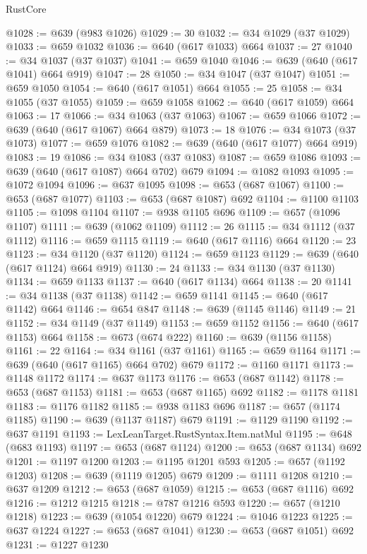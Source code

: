 \begin{lexlean}{RustCore}
\begin{coremodule}
@1028 := @639 (@983 @1026)
@1029 := 30
@1032 := @34 @1029 (@37 @1029)
@1033 := @659 @1032
@1036 := @640 (@617 @1033) @664
@1037 := 27
@1040 := @34 @1037 (@37 @1037)
@1041 := @659 @1040
@1046 := @639 (@640 (@617 @1041) @664 @919)
@1047 := 28
@1050 := @34 @1047 (@37 @1047)
@1051 := @659 @1050
@1054 := @640 (@617 @1051) @664
@1055 := 25
@1058 := @34 @1055 (@37 @1055)
@1059 := @659 @1058
@1062 := @640 (@617 @1059) @664
@1063 := 17
@1066 := @34 @1063 (@37 @1063)
@1067 := @659 @1066
@1072 := @639 (@640 (@617 @1067) @664 @879)
@1073 := 18
@1076 := @34 @1073 (@37 @1073)
@1077 := @659 @1076
@1082 := @639 (@640 (@617 @1077) @664 @919)
@1083 := 19
@1086 := @34 @1083 (@37 @1083)
@1087 := @659 @1086
@1093 := @639 (@640 (@617 @1087) @664 @702) @679
@1094 := @1082 @1093
@1095 := @1072 @1094
@1096 := @637 @1095
@1098 := @653 (@687 @1067)
@1100 := @653 (@687 @1077)
@1103 := @653 (@687 @1087) @692
@1104 := @1100 @1103
@1105 := @1098 @1104
@1107 := @938 @1105 @696
@1109 := @657 (@1096 @1107)
@1111 := @639 (@1062 @1109)
@1112 := 26
@1115 := @34 @1112 (@37 @1112)
@1116 := @659 @1115
@1119 := @640 (@617 @1116) @664
@1120 := 23
@1123 := @34 @1120 (@37 @1120)
@1124 := @659 @1123
@1129 := @639 (@640 (@617 @1124) @664 @919)
@1130 := 24
@1133 := @34 @1130 (@37 @1130)
@1134 := @659 @1133
@1137 := @640 (@617 @1134) @664
@1138 := 20
@1141 := @34 @1138 (@37 @1138)
@1142 := @659 @1141
@1145 := @640 (@617 @1142) @664
@1146 := @654 @847
@1148 := @639 (@1145 @1146)
@1149 := 21
@1152 := @34 @1149 (@37 @1149)
@1153 := @659 @1152
@1156 := @640 (@617 @1153) @664
@1158 := @673 (@674 @222)
@1160 := @639 (@1156 @1158)
@1161 := 22
@1164 := @34 @1161 (@37 @1161)
@1165 := @659 @1164
@1171 := @639 (@640 (@617 @1165) @664 @702) @679
@1172 := @1160 @1171
@1173 := @1148 @1172
@1174 := @637 @1173
@1176 := @653 (@687 @1142)
@1178 := @653 (@687 @1153)
@1181 := @653 (@687 @1165) @692
@1182 := @1178 @1181
@1183 := @1176 @1182
@1185 := @938 @1183 @696
@1187 := @657 (@1174 @1185)
@1190 := @639 (@1137 @1187) @679
@1191 := @1129 @1190
@1192 := @637 @1191
@1193 := LexLeanTarget.RustSyntax.Item.natMul
@1195 := @648 (@683 @1193)
@1197 := @653 (@687 @1124)
@1200 := @653 (@687 @1134) @692
@1201 := @1197 @1200
@1203 := @1195 @1201 @593
@1205 := @657 (@1192 @1203)
@1208 := @639 (@1119 @1205) @679
@1209 := @1111 @1208
@1210 := @637 @1209
@1212 := @653 (@687 @1059)
@1215 := @653 (@687 @1116) @692
@1216 := @1212 @1215
@1218 := @787 @1216 @593
@1220 := @657 (@1210 @1218)
@1223 := @639 (@1054 @1220) @679
@1224 := @1046 @1223
@1225 := @637 @1224
@1227 := @653 (@687 @1041)
@1230 := @653 (@687 @1051) @692
@1231 := @1227 @1230

\end{coremodule}
\end{lexlean}
